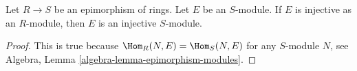 \begin{lemma}
\label{lemma-injective-epimorphism}
Let $R \to S$ be an epimorphism of rings. Let $E$ be an $S$-module.
If $E$ is injective as an $R$-module, then $E$ is an injective $S$-module.
\end{lemma}

\begin{proof}
This is true because $\Hom_R(N, E) = \Hom_S(N, E)$ for any $S$-module $N$,
see Algebra, Lemma \ref{algebra-lemma-epimorphism-modules}.
\end{proof}

